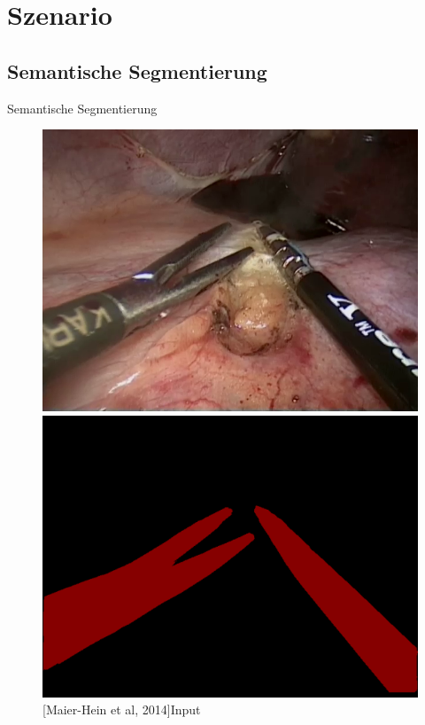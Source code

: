 
\section{Szenario}
\subsection{Semantische Segmentierung}
\begin{frame}{Semantische Segmentierung}
    \begin{figure}[ht]
        \begin{minipage}[b]{0.45\linewidth}
            \centering
            \includegraphics[width=\textwidth]{../images/img_35_raw.png}
            \caption{[Maier-Hein et al, 2014]\hspace{\textwidth}Input}
            \label{fig:input}
        \end{minipage}
        \hspace{0.5cm}
        \begin{minipage}[b]{0.45\linewidth}
            \centering
            \includegraphics[width=\textwidth]{../images/img_35_label.png}

\end{minipage}
\end{figure}
\end{frame}
